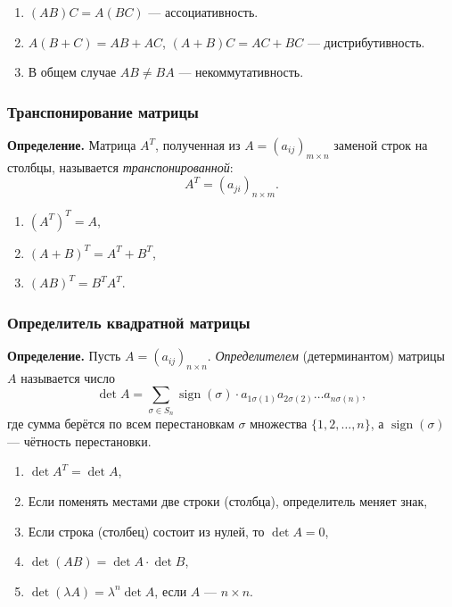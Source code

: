 \documentclass[12pt, a4paper]{article}
\begin{document}
\begin{tcolorbox}[title=Свойства умножения матриц]
\begin{enumerate}
    \item $(AB)C = A(BC)$ — ассоциативность.
    \item $A(B + C) = AB + AC$, $(A + B)C = AC + BC$ — дистрибутивность.
    \item В общем случае $AB \ne BA$ — некоммутативность.
\end{enumerate}
\end{tcolorbox}

\subsubsection{Транспонирование матрицы}
\begin{tcolorbox}
\textbf{Определение.} Матрица $A^T$, полученная из $A = (a_{ij})_{m\times n}$ заменой строк на столбцы, называется \textit{транспонированной}:
\[
A^T = (a_{ji})_{n\times m}.
\]
\end{tcolorbox}

\begin{tcolorbox}[title=Свойства транспонирования]
\begin{enumerate}
    \item $(A^T)^T = A$,
    \item $(A + B)^T = A^T + B^T$,
    \item $(AB)^T = B^T A^T$.
\end{enumerate}
\end{tcolorbox}

\subsubsection{Определитель квадратной матрицы}
\begin{tcolorbox}
\textbf{Определение.} Пусть $A = (a_{ij})_{n\times n}$. \textit{Определителем} (детерминантом) матрицы $A$ называется число
\[
\det A = \sum_{\sigma \in S_n} \operatorname{sign}(\sigma) \cdot a_{1\sigma(1)} a_{2\sigma(2)} \dots a_{n\sigma(n)},
\]
где сумма берётся по всем перестановкам $\sigma$ множества $\{1,2,\dots,n\}$, а $\operatorname{sign}(\sigma)$ — чётность перестановки.
\end{tcolorbox}

\begin{tcolorbox}[title=Свойства определителя]
\begin{enumerate}
    \item $\det A^T = \det A$,
    \item Если поменять местами две строки (столбца), определитель меняет знак,
    \item Если строка (столбец) состоит из нулей, то $\det A = 0$,
    \item $\det(AB) = \det A \cdot \det B$,
    \item $\det(\lambda A) = \lambda^n \det A$, если $A$ — $n\times n$.
\end{enumerate}
\end{tcolorbox}
\end{document}
